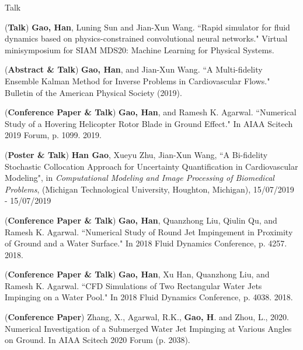 \documentclass{resume} %
\begin{document}
\begin{rSection}{Talk}
\item (\textbf{\color{red}Talk}) \textbf{Gao, Han}, Luning Sun and Jian-Xun Wang. ``Rapid simulator for fluid dynamics based on physics-constrained convolutional neural networks." Virtual minisymposium for SIAM MDS20: Machine Learning for Physical Systems.


\item (\textbf{\color{red}Abstract \& Talk}) \textbf{Gao, Han}, and Jian-Xun Wang. ``A Multi-fidelity Ensemble Kalman Method for Inverse Problems in Cardiovascular Flows." Bulletin of the American Physical Society (2019). 
\item(\textbf{\color{red}Conference Paper \& Talk}) \textbf{Gao, Han}, and Ramesh K. Agarwal. ``Numerical Study of a Hovering Helicopter Rotor Blade in Ground Effect." In AIAA Scitech 2019 Forum, p. 1099. 2019.

\item (\textbf{\color{red}Poster \& Talk}) \textbf{Han Gao}, Xueyu Zhu, Jian-Xun Wang, ``A Bi-fidelity Stochastic Collocation Approach for Uncertainty Quantification in Cardiovascular Modeling", in \textit{Computational Modeling and Image Processing of Biomedical Problems}, (Michigan Technological University, Houghton, Michigan), 15/07/2019 - 15/07/2019 

\item(\textbf{\color{red}Conference Paper \& Talk}) \textbf{Gao, Han}, Quanzhong Liu, Qiulin Qu, and Ramesh K. Agarwal. ``Numerical Study of Round Jet Impingement in Proximity of Ground and a Water Surface." In 2018 Fluid Dynamics Conference, p. 4257. 2018.
\item (\textbf{\color{red}Conference Paper \& Talk}) \textbf{Gao, Han}, Xu Han, Quanzhong Liu, and Ramesh K. Agarwal. ``CFD Simulations of Two Rectangular Water Jets Impinging on a Water Pool." In 2018 Fluid Dynamics Conference, p. 4038. 2018.

\item (\textbf{\color{red}Conference Paper}) Zhang, X., Agarwal, R.K., \textbf{Gao, H}. and Zhou, L., 2020. Numerical Investigation of a Submerged Water Jet Impinging at Various Angles on Ground. In AIAA Scitech 2020 Forum (p. 2038). 


\end{rSection}
\end{document}
